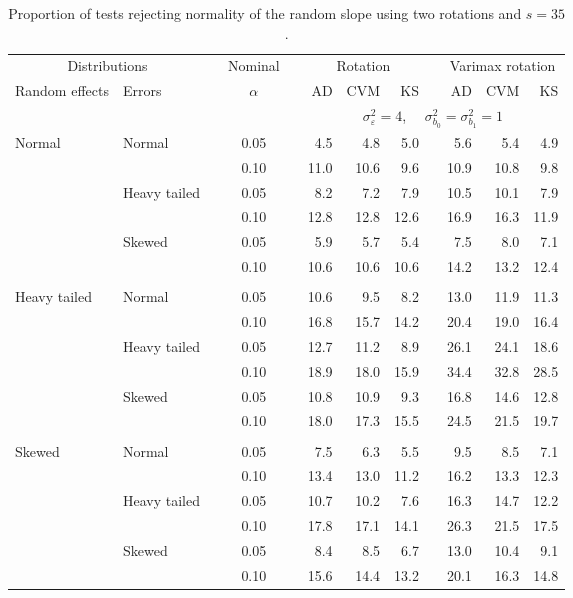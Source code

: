 \begin{table}[ht]
\centering
\caption{\label{tab:fixedsimb135} Proportion of tests rejecting normality of the random slope using two rotations and $s = 35$.}
\begin{scriptsize}
\begin{tabular}{ll p{.1cm} c p{.1cm} rrr p{.1cm} rrr}
  \hline
  \multicolumn{2}{c}{Distributions}& & Nominal & &  \multicolumn{3}{c}{Rotation} & & \multicolumn{3}{c}{Varimax rotation} \\ \cline{1-2} \cline{6-8} \cline{10-12}   
  Random effects & Errors & & $\alpha$ & & AD & CVM & KS & & AD & CVM & KS \\ 
   \hline
& && && \multicolumn{7}{c}{$\sigma_{\varepsilon}^2 = 4$, \ \ $\sigma_{b_0}^2 = \sigma_{b_1}^2 = 1$} \\ \cline{6-12}
\rowcolor{gray!20} Normal & Normal &  & 0.05 &  & 4.5 & 4.8 & 5.0 &  & 5.6 & 5.4 & 4.9 \\ 
\rowcolor{gray!20}    &  &  & 0.10 &  & 11.0 & 10.6 & 9.6 &  & 10.9 & 10.8 & 9.8 \\ 
\rowcolor{gray!20}    & Heavy tailed &  & 0.05 &  & 8.2 & 7.2 & 7.9 &  & 10.5 & 10.1 & 7.9 \\ 
\rowcolor{gray!20}    &  &  & 0.10 &  & 12.8 & 12.8 & 12.6 &  & 16.9 & 16.3 & 11.9 \\ 
\rowcolor{gray!20}    & Skewed &  & 0.05 &  & 5.9 & 5.7 & 5.4 &  & 7.5 & 8.0 & 7.1 \\ 
\rowcolor{gray!20}    &  &  & 0.10 &  & 10.6 & 10.6 & 10.6 &  & 14.2 & 13.2 & 12.4 \\ 
&&&&&&&&&&&\\
  Heavy tailed & Normal &  & 0.05 &  & 10.6 & 9.5 & 8.2 &  & 13.0 & 11.9 & 11.3 \\ 
 &  &  & 0.10 &  & 16.8 & 15.7 & 14.2 &  & 20.4 & 19.0 & 16.4 \\ 
 & Heavy tailed &  & 0.05 &  & 12.7 & 11.2 & 8.9 &  & 26.1 & 24.1 & 18.6 \\ 
 &  &  & 0.10 &  & 18.9 & 18.0 & 15.9 &  & 34.4 & 32.8 & 28.5 \\ 
 & Skewed &  & 0.05 &  & 10.8 & 10.9 & 9.3 &  & 16.8 & 14.6 & 12.8 \\ 
 &  &  & 0.10 &  & 18.0 & 17.3 & 15.5 &  & 24.5 & 21.5 & 19.7 \\ 
&&&&&&&&&&&\\
  Skewed & Normal &  & 0.05 &  & 7.5 & 6.3 & 5.5 &  & 9.5 & 8.5 & 7.1 \\ 
   &  &  & 0.10 &  & 13.4 & 13.0 & 11.2 &  & 16.2 & 13.3 & 12.3 \\ 
   & Heavy tailed &  & 0.05 &  & 10.7 & 10.2 & 7.6 &  & 16.3 & 14.7 & 12.2 \\ 
   &  &  & 0.10 &  & 17.8 & 17.1 & 14.1 &  & 26.3 & 21.5 & 17.5 \\ 
   & Skewed &  & 0.05 &  & 8.4 & 8.5 & 6.7 &  & 13.0 & 10.4 & 9.1 \\ 
   &  &  & 0.10 &  & 15.6 & 14.4 & 13.2 &  & 20.1 & 16.3 & 14.8 \\ 


\end{tabular}
\end{scriptsize}
\end{table}
